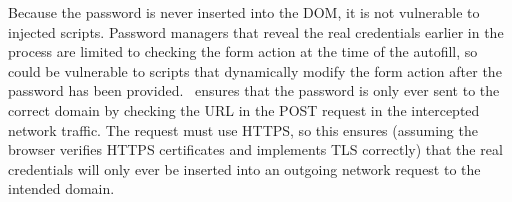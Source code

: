 Because the password is never inserted into the DOM, it is not vulnerable to injected scripts. Password managers that reveal the real credentials earlier in the process are limited to checking the form action at the time of the autofill, so could be vulnerable to scripts that dynamically modify the form action after the password has been provided. \SecPass\ ensures that the password is only ever sent to the correct domain by checking the URL in the POST request in the intercepted network traffic.  The request must use HTTPS, so this ensures (assuming the browser verifies HTTPS certificates and implements TLS correctly) that the real credentials will only ever be inserted into an outgoing network request to the intended domain.  


